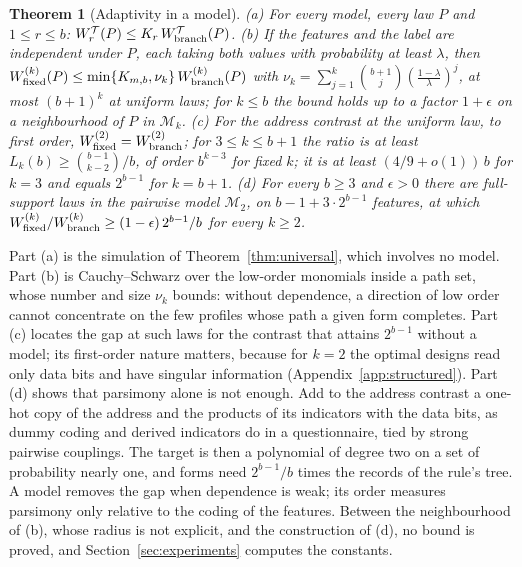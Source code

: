 \documentclass{article}
\newtheorem{theorem}{Theorem}
\begin{document}
\begin{theorem}[Adaptivity in a model]\label{thm:structured}
\textup{(a)} For every model, every law $P$ and $1\le r\le b$: $W^{\mathcal T}_r(P)\le K_r\,W^{\mathcal T}_{\rm branch}(P)$.
\textup{(b)} If the features and the label are independent under $P$, each taking both values with probability at least $\lambda$, then $W^{(k)}_{\rm fixed}(P)\le\min\{K_{m,b},\nu_k\}\,W^{(k)}_{\rm branch}(P)$ with $\nu_k=\sum_{j=1}^k\binom{b+1}j(\frac{1-\lambda}\lambda)^j$, at most $(b+1)^k$ at uniform laws; for $k\le b$ the bound holds up to a factor $1+\epsilon$ on a neighbourhood of $P$ in $\mathcal M_k$.
\textup{(c)} For the address contrast at the uniform law, to first order, $W^{(2)}_{\rm fixed}=W^{(2)}_{\rm branch}$; for $3\le k\le b+1$ the ratio is at least $L_k(b)\ge\binom{b-1}{k-2}/b$, of order $b^{k-3}$ for fixed $k$; it is at least $(4/9+o(1))\,b$ for $k=3$ and equals $2^{b-1}$ for $k=b+1$.
\textup{(d)} For every $b\ge3$ and $\epsilon>0$ there are full-support laws in the pairwise model $\mathcal M_2$, on $b-1+3\cdot2^{b-1}$ features, at which $W^{(k)}_{\rm fixed}/W^{(k)}_{\rm branch}\ge(1-\epsilon)\,2^{b-1}/b$ for every $k\ge2$.
\end{theorem}
Part (a) is the simulation of Theorem~\ref{thm:universal}, which involves no model. Part (b) is Cauchy--Schwarz over the low-order monomials inside a path set, whose number and size $\nu_k$ bounds: without dependence, a direction of low order cannot concentrate on the few profiles whose path a given form completes. Part (c) locates the gap at such laws for the contrast that attains $2^{b-1}$ without a model; its first-order nature matters, because for $k=2$ the optimal designs read only data bits and have singular information (Appendix~\ref{app:structured}). Part (d) shows that parsimony alone is not enough. Add to the address contrast a one-hot copy of the address and the products of its indicators with the data bits, as dummy coding and derived indicators do in a questionnaire, tied by strong pairwise couplings. The target is then a polynomial of degree two on a set of probability nearly one, and forms need $2^{b-1}/b$ times the records of the rule's tree. A model removes the gap when dependence is weak; its order measures parsimony only relative to the coding of the features. Between the neighbourhood of (b), whose radius is not explicit, and the construction of (d), no bound is proved, and Section~\ref{sec:experiments} computes the constants.


\end{document}

